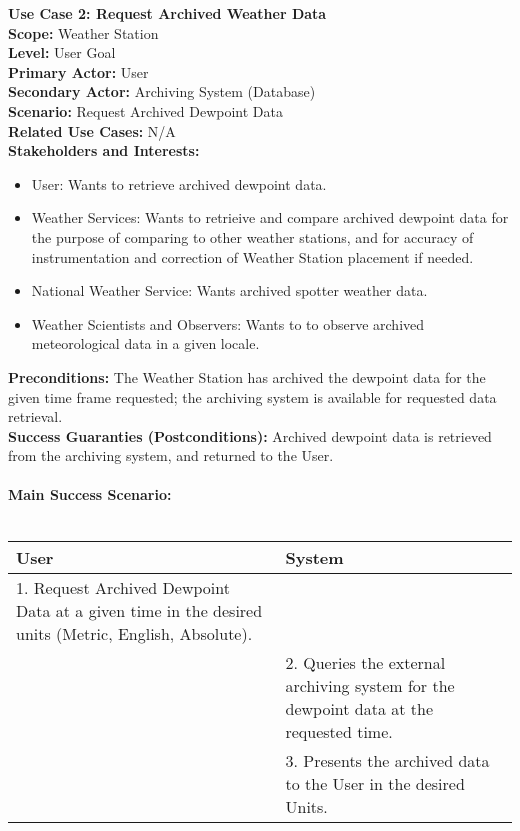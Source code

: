 \documentclass[letterpaper]{article}
\begin{document}
\noindent
\textbf{Use Case 2:  Request Archived Weather Data}\\
\textbf{Scope:  }Weather Station\\
\textbf{Level:  }User Goal\\
\textbf{Primary Actor:  }User\\
\textbf{Secondary Actor:  }Archiving System (Database)\\
\textbf{Scenario:  }Request Archived Dewpoint Data\\
\textbf{Related Use Cases:  }N/A\\
\textbf{Stakeholders and Interests:  }
\begin{itemize}
\item User:  Wants to retrieve archived dewpoint data.
\item Weather Services:  Wants to retrieive and compare archived
dewpoint data for the purpose of comparing to other weather
stations, and for accuracy of instrumentation and correction of
Weather Station placement if needed.
\item National Weather Service:  Wants archived spotter weather data.
\item Weather Scientists and Observers:  Wants to to observe archived
meteorological data in a given locale.
\end{itemize}
\textbf{Preconditions:  }The Weather Station has archived the
dewpoint data for the given time frame requested; the
archiving system is available for requested data retrieval.\\
\textbf{Success Guaranties (Postconditions):  }Archived dewpoint
data is retrieved from the archiving system, and returned to the
User.\\\\
\textbf{Main Success Scenario:  }\\\\
\begin{tabular}{|p{6cm}|p{6cm}|}\hline
\textbf{User} & \textbf{System}\\\hline
1. Request Archived Dewpoint Data at a given time in the
desired units (Metric, English, Absolute).&\\\hline
&2.  Queries the external archiving system for the dewpoint
data at the requested time.\\\hline
&3.  Presents the archived data to the User in the desired
Units.\\\hline
\end{tabular}\\\\
\end{document}
